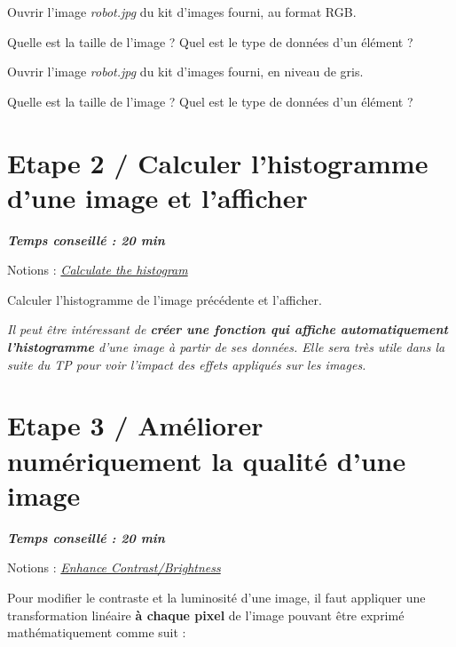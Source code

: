 \documentclass[a4paper,11pt,titlepage]{article} %
\begin{document}
\Manip Ouvrir l'image \textsl{robot.jpg} du kit d'images fourni, au format RGB.

\Quest Quelle est la taille de l'image ? Quel est le type de données d'un élément ?

\Manip Ouvrir l'image \textsl{robot.jpg} du kit d'images fourni, en niveau de gris.

\Quest Quelle est la taille de l'image ? Quel est le type de données d'un élément ?


\section{Etape 2 / Calculer l'histogramme d'une image et l'afficher}

\begin{center} \textbf{\textit{Temps conseillé : 20 min}} \end{center}

\begin{mdframed}[style=sidebar,frametitle={}]
Notions : \href{https://iogs-lense-training.github.io/image-processing/contents/opencv.html#histogram-of-an-image}{\textit{Calculate the histogram}}
\end{mdframed}

\Manip Calculer l'histogramme de l'image précédente et l'afficher.

\medskip

\textit{Il peut être intéressant de \textbf{créer une fonction qui affiche automatiquement l'histogramme} d'une image à partir de ses données. Elle sera très utile dans la suite du TP pour voir l'impact des effets appliqués sur les images.}


\section{Etape 3 / Améliorer numériquement la qualité d'une image}

\begin{center} \textbf{\textit{Temps conseillé : 20 min}} \end{center}

\begin{mdframed}[style=sidebar,frametitle={}]
Notions : \href{https://iogs-lense-training.github.io/image-processing/contents/opencv.html#enhance-the-image-contrast-and-brightness
}{\textit{Enhance Contrast/Brightness}}
\end{mdframed}

Pour modifier le contraste et la luminosité d'une image, il faut appliquer une transformation linéaire \textbf{à chaque pixel} de l'image pouvant être exprimé mathématiquement comme suit :
\end{document}
